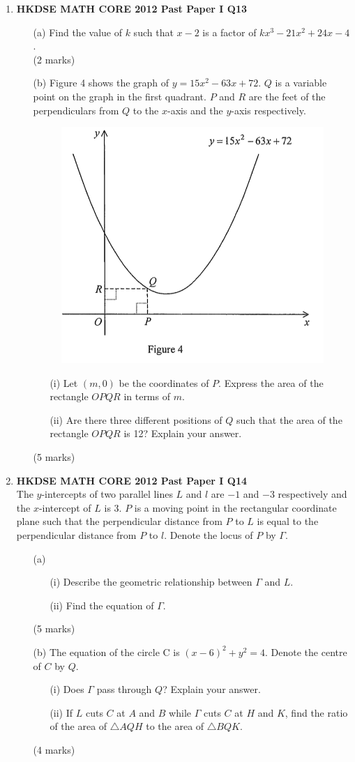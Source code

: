 \documentclass[12pt]{article}
\begin{document}
\begin{enumerate}
	\item \textbf{HKDSE MATH CORE 2012 Past Paper I Q13}
	\begin{enumerate}
		\item[(a)] Find the value of $k$ such that $x - 2$ is a factor of $kx^3 - 21x^2 + 24x - 4$. \\(2 marks)
		\item[(b)] Figure 4 shows the graph of $y = 15x^2 - 63x + 72$. $Q$ is a variable point on the graph in the first quadrant. $P$ and $R$ are the feet of the perpendiculars from $Q$ to the $x$-axis and the $y$-axis respectively.
		\begin{figure}[H]
			\centering
			\includegraphics[width = .3\linewidth]{2012Figure1.4}
		\end{figure}
		\begin{enumerate}
			\item[(i)] Let $(m, 0)$ be the coordinates of $P$. Express the area of the rectangle $OPQR$ in terms of $m$.
			\item[(ii)] Are there three different positions of $Q$ such that the area of the rectangle $OPQR$ is 12? Explain your answer.
		\end{enumerate}
		(5 marks)
	\end{enumerate}

	\item \textbf{HKDSE MATH CORE 2012 Past Paper I Q14}\\
	The $y$-intercepts of two parallel lines $L$ and $l$ are $-1$ and $-3$ respectively and the $x$-intercept of $L$ is 3. $P$ is a moving point in the rectangular coordinate plane such that the perpendicular distance from $P$ to $L$ is equal to the perpendicular distance from $P$ to $l$. Denote the locus of $P$ by $\Gamma$.
	\begin{enumerate}
		\item[(a)]\begin{enumerate}
			\item[(i)] Describe the geometric relationship between $\Gamma$ and $L$.
			\item[(ii)] Find the equation of $\Gamma$.
		\end{enumerate}
		(5 marks)
		\item[(b)] The equation of the circle C is $(x-6)^2 + y^2 = 4$. Denote the centre of $C$ by $Q$.
		\begin{enumerate}
			\item[(i)] Does $\Gamma$ pass through $Q$? Explain your answer.
			\item[(ii)] If $L$ cuts $C$ at $A$ and $B$ while $\Gamma$ cuts $C$ at $H$ and $K$, find the ratio of the area of $\triangle AQH$ to the area of $\triangle BQK$.
		\end{enumerate}
		(4 marks)
	\end{enumerate}


\end{enumerate}
\end{document}
